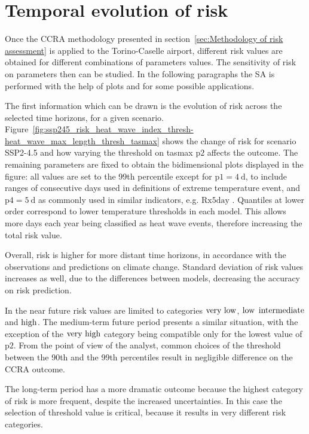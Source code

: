 \section{Temporal evolution of risk}
Once the \gls{CCRA} methodology presented in section~\ref{sec:Methodology of risk assessment} is applied to the Torino-Caselle airport, different \gls{risk} values are obtained for different combinations of parameters values.
The sensitivity of risk on parameters then can be studied. In the following paragraphs the \gls{SA} is performed with the help of plots and for some possible applications.

The first information which can be drawn is the evolution of \gls{risk} across the selected time horizons, for a given scenario. Figure~\ref{fig:ssp245_risk_heat_wave_index_thresh-heat_wave_max_length_thresh_tasmax} shows the change of risk for scenario SSP2-4.5 and how varying the threshold on \gls{tasmax} $\mathrm{p2}$ affects the outcome.
The remaining parameters are fixed to obtain the bidimensional plots displayed in the figure: all values are set to the 99th percentile except for $\mathrm{p1} = \qty{4}{\day}$, to include ranges of consecutive days used in definitions of extreme temperature event, and $\mathrm{p4} = \qty{5}{\day}$ as commonly used in similar indicators, e.g. $\mathrm{Rx5day}$ \cite[2208]{2021GutierrezAnnexVI}.
Quantiles at lower order correspond to lower temperature thresholds in each model. This allows more days each year being classified as heat wave events, therefore increasing the total risk value.

Overall, risk is higher for more distant time horizons, in accordance with the observations and predictions on climate change. Standard deviation of risk values increases as well, due to the differences between models, decreasing the accuracy on risk prediction.

In the near future risk values are limited to categories $\text{very low}$, $\text{low}$ $\text{intermediate}$ and $\text{high}$. The medium-term future period presents a similar situation, with the exception of the $\text{very high}$ category being compatible only for the lowest value of $\mathrm{p2}$. From the point of view of the analyst, common choices of the threshold between the 90th and the 99th percentiles result in negligible difference on the \gls{CCRA} outcome.

The long-term period has a more dramatic outcome because the highest category of risk is more frequent, despite the increased uncertainties. In this case the selection of threshold value is critical, because it results in very different risk categories.

